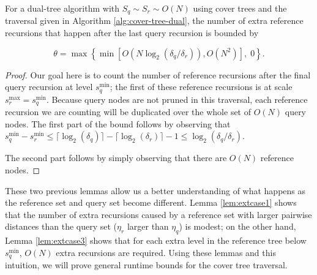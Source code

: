 \begin{lemma}
\label{lem:extcase3}
For a dual-tree algorithm with $S_q \sim S_r \sim O(N)$ using cover trees and
the traversal given in Algorithm \ref{alg:cover-tree-dual}, the number of extra
reference recursions that happen after the last query recursion is bounded by

\begin{equation}
\theta = \max\left\{\min\left[O(N \log_2(\delta_q / \delta_r)),
O(N^2)\right], \; 0\right\}.
\end{equation}
\end{lemma}

\begin{proof}
Our goal here is to count the number of reference recursions after the final
query recursion at level $s_q^{\min}$; the first of these reference recursions
is at scale $s_r^{\max} = s_q^{\min}$.  Because query nodes are not pruned in
this traversal, each reference recursion we are counting will be duplicated over
the whole set of $O(N)$ query nodes.  The first part of the bound follows by
observing that
$s_q^{\min} - s_r^{\min} \le \lceil \log_2(\delta_q) \rceil -
\lceil \log_2(\delta_r) \rceil - 1 \le \log_2(\delta_q / \delta_r)$.

The second part follows by simply observing that there are $O(N)$ reference
nodes.
\end{proof}

These two previous lemmas allow us a better understanding of what happens as the
reference set and query set become different.  Lemma \ref{lem:extcase1} shows
that the number of extra recursions caused by a reference set with larger
pairwise distances than the query set ($\eta_r$ larger than $\eta_q$) is modest;
on the other hand, Lemma \ref{lem:extcase3} shows that for each extra level in
the reference tree below $s_q^{\min}$, $O(N)$ extra recursions are required.
Using these lemmas and this intuition, we will prove general runtime bounds for
the cover tree traversal.

